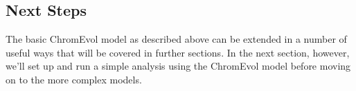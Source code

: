 \subsection{Next Steps}


The basic ChromEvol model as described above can be extended in a number of useful ways 
that will be covered in further sections.
In the next section, however, we'll set up and run a simple \RevBayes analysis using the ChromEvol model
before moving on to the more complex models.

 

\newpage
